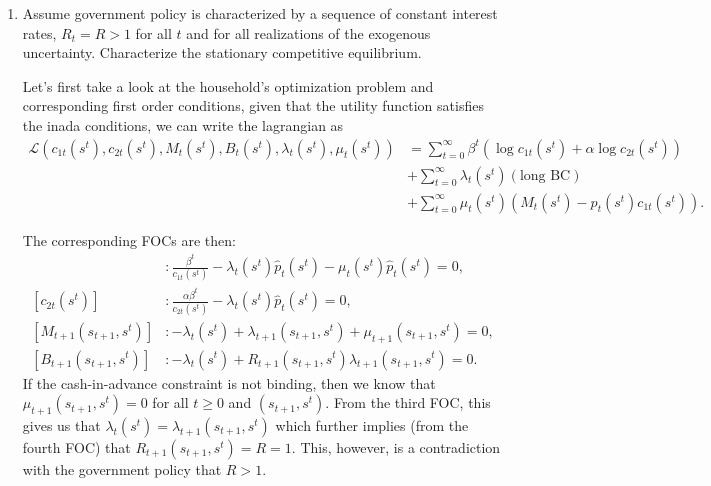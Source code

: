 \documentclass[11pt,english]{article}
\begin{document}
\begin{enumerate}[label = (\alph*)]
\begin{solution}
\begin{itemize}
\begin{align*}
\end{align*}
\end{itemize}
\end{solution}
    \item Assume government policy is characterized by a sequence of constant interest rates, $R_t = R > 1$ for all $t$ and for all realizations of the exogenous uncertainty. Characterize the stationary competitive equilibrium.
\begin{solution}
Let's first take a look at the household's optimization problem and corresponding first order conditions, given that the utility function satisfies the inada conditions, we can write the lagrangian as
\begin{align*}
\mathcal{L}(c_{1t}(s^t), c_{2t}(s^t), M_t(s^t), B_t(s^t), \lambda_t(s^t), \mu_t(s^t)) &= \sum_{t=0}^\infty \beta^t(\log c_{1t}(s^t) + \alpha \log c_{2t}(s^t)) \\&+ \sum_{t=0}^\infty\lambda_t(s^t)(\text{long BC})\\& + \sum_{t=0}^\infty\mu_t(s^t)(M_t(s^t) - p_t(s^t)c_{1t}(s^t)).
\end{align*}

The corresponding FOCs are then:
\begin{align*}
[c_{1t}(s^t)]&: \frac{\beta^t}{c_{1t}(s^t)} - \lambda_{t}(s^t) \hat{p}_t(s^t) - \mu_{t}(s^t)\hat{p}_t(s^t) = 0,\\
[c_{2t}(s^t)]&: \frac{\alpha \beta^t}{c_{2t}(s^t)} - \lambda_{t}(s^t) \hat{p}_t(s^t) = 0,\\
[M_{t+1}(s_{t+1},s^t)]&:-\lambda_t(s^t) +  \lambda_{t+1}(s_{t+1},s^t) + \mu_{t+1}(s_{t+1},s^t) = 0,\\
[B_{t+1}(s_{t+1},s^t)]&:  -\lambda_t(s^t) + R_{t+1}(s_{t+1},s^t)\lambda_{t+1}(s_{t+1},s^t) = 0.
\end{align*} 
If the cash-in-advance constraint is not binding, then we know that $\mu_{t+1}(s_{t+1},s^t) = 0$ for all $t\geq 0$ and $(s_{t+1},s^t)$. From the third FOC, this gives us that $\lambda_t(s^t) = \lambda_{t+1}(s_{t+1},s^t)$ which further implies (from the fourth FOC) that $R_{t+1}(s_{t+1},s^t) = R = 1$. This, however, is a contradiction with the government policy that $R > 1$.


\end{solution}
\end{enumerate}
\end{document}
